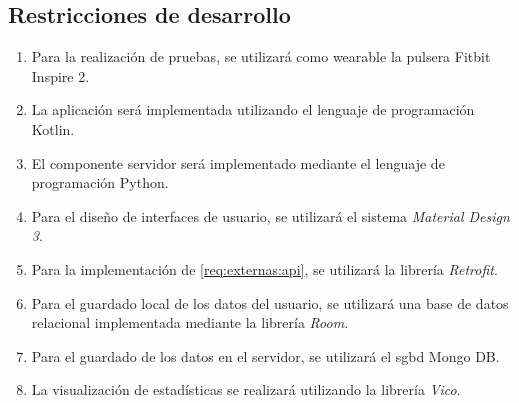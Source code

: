     \subsection{Restricciones de desarrollo}
        \label{req:externas:restricciones}
        \begin{enumerate}[label=\textbf{\texttt{RD-\arabic*}}]
            \item Para la realización de pruebas, se utilizará como \gls{wearable} la pulsera Fitbit Inspire 2.
            \item La aplicación será implementada utilizando el lenguaje de programación Kotlin.
            \item El componente servidor será implementado mediante el lenguaje de programación Python.
            \item Para el diseño de interfaces de usuario, se utilizará el sistema \textit{Material Design 3}.
            \item Para la implementación de \ref{req:externas:api}, se utilizará la librería \textit{Retrofit}.
            \item Para el guardado local de los datos del usuario, se utilizará una base de datos relacional implementada mediante la librería \textit{Room}.
            \item Para el guardado de los datos en el servidor, se utilizará el \gls{sgbd} Mongo DB.
            \item La visualización de estadísticas se realizará utilizando la librería \textit{Vico}.
        \end{enumerate}
        